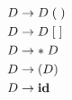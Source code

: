 
\setcounter{equation}{0}
\begin{align}
	D &\to D\;(\;) \\
	D &\to D\;[\;] \\
	D &\to *\;D 	 \\
	D &\to (D)		 \\
	D &\to \text{\bf id}
\end{align}